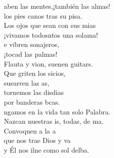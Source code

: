 \documentclass[12pt]{article}
\begin{document}
\begin{multicols*}{2}
\begin{cancion}
\jump
	aben las mentes,¡también las almas!\\
	los pies canos tras su pisa.\\
	Los ojos que sean con sus mias\\
	¡vivamos todosntos una solama!\\
\jump
	e vibren sonajeros, \\
¡tocad las palmas!\\
	Flauta y vion, suenen guitars.\\
	Que griten los sicios, \\
	susurren las as,\\
	tornemos las disdias\\
	por banderas bcas.\\
\jump
	ngamos en la vida tan solo Palabra.\\
	Nazcan nuestras is, todas, de ma.\\
	Convoquen a la a\\
	que nos trae Dios y va\\
	y Él nos ilne como sol delba.\\
\end{cancion}%


\end{multicols*}
\end{document}
